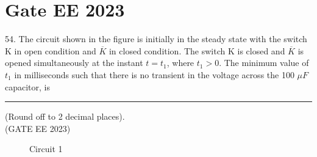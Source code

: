 \documentclass[journal,12pt,twocolumn]{IEEEtran}
\begin{document}


\vspace{3cm}

\title{}
\author{EE23BTECH11054 -  Sai Krishna Shanigarapu$^{*}$
}
\maketitle
\newpage
\bigskip


\section*{Gate EE 2023}
54. \hspace{2pt}The circuit shown in the figure is initially in the steady state with the switch K in open condition and $\overline{K}$ in closed condition. The switch K is closed and $\overline{K}$ is opened simultaneously at the instant $t = t_1$, where $t_1 > 0$. The minimum value of $t_1$ in milliseconds such that there is no transient in the voltage across the 100 $\mu F$ capacitor, is \rule{1cm}{0.15mm} (Round off to 2 decimal places).\\ 
\hfill(GATE EE 2023)

\begin{figure}[ht]
  \centering
  \begin{adjustbox}{width=1\columnwidth}
      
  \end{adjustbox}
  \caption{Circuit 1}
\end{figure}
\end{document}
